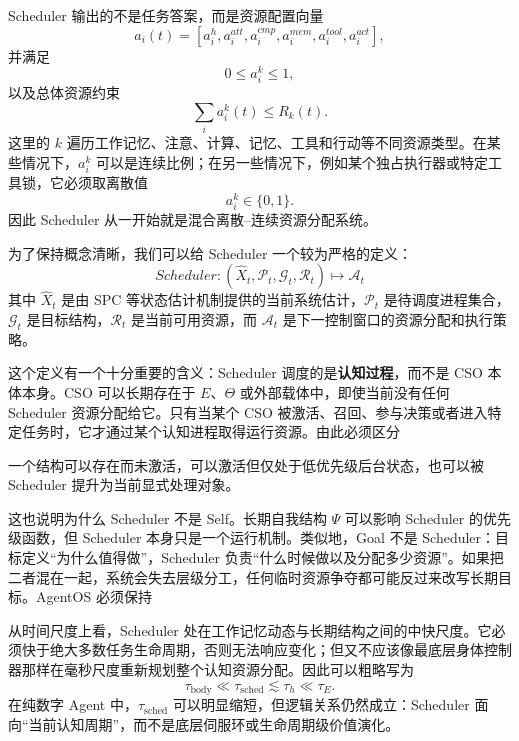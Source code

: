 Scheduler 输出的不是任务答案，而是资源配置向量
\[
a_i(t)=
\left[
a_i^h,
a_i^{att},
a_i^{cmp},
a_i^{mem},
a_i^{tool},
a_i^{act}
\right],
\]
并满足
\[
0\leq a_i^k\leq 1,
\]
以及总体资源约束
\[
\sum_i a_i^k(t)\leq R_k(t).
\]
这里的 $k$ 遍历工作记忆、注意、计算、记忆、工具和行动等不同资源类型。在某些情况下，$a_i^k$ 可以是连续比例；在另一些情况下，例如某个独占执行器或特定工具锁，它必须取离散值
\[
a_i^k\in\{0,1\}.
\]
因此 Scheduler 从一开始就是混合离散--连续资源分配系统。

为了保持概念清晰，我们可以给 Scheduler 一个较为严格的定义：
\[
\boxed{
Scheduler:
(\widehat X_t,\mathcal P_t,\mathcal G_t,\mathcal R_t)
\mapsto
\mathcal A_t
}
\]
其中 $\widehat X_t$ 是由 SPC 等状态估计机制提供的当前系统估计，$\mathcal P_t$ 是待调度进程集合，$\mathcal G_t$ 是目标结构，$\mathcal R_t$ 是当前可用资源，而 $\mathcal A_t$ 是下一控制窗口的资源分配和执行策略。

这个定义有一个十分重要的含义：Scheduler 调度的是\textbf{认知过程}，而不是 CSO 本体本身。CSO 可以长期存在于 $E$、$\Theta$ 或外部载体中，即使当前没有任何 Scheduler 资源分配给它。只有当某个 CSO 被激活、召回、参与决策或者进入特定任务时，它才通过某个认知进程取得运行资源。由此必须区分
\begin{statementbox}
\centering
{}
\end{statementbox}
一个结构可以存在而未激活，可以激活但仅处于低优先级后台状态，也可以被 Scheduler 提升为当前显式处理对象。

这也说明为什么 Scheduler 不是 Self。长期自我结构 $\Psi$ 可以影响 Scheduler 的优先级函数，但 Scheduler 本身只是一个运行机制。类似地，Goal 不是 Scheduler：目标定义“为什么值得做”，Scheduler 负责“什么时候做以及分配多少资源”。如果把二者混在一起，系统会失去层级分工，任何临时资源争夺都可能反过来改写长期目标。AgentOS 必须保持
\begin{statementbox}
\centering
{}
\end{statementbox}

从时间尺度上看，Scheduler 处在工作记忆动态与长期结构之间的中快尺度。它必须快于绝大多数任务生命周期，否则无法响应变化；但又不应该像最底层身体控制器那样在毫秒尺度重新规划整个认知资源分配。因此可以粗略写为
\[
\tau_{\mathrm{body}}
\ll
\tau_{\mathrm{sched}}
\lesssim
\tau_h
\ll
\tau_E.
\]
在纯数字 Agent 中，$\tau_{\mathrm{sched}}$ 可以明显缩短，但逻辑关系仍然成立：Scheduler 面向“当前认知周期”，而不是底层伺服环或生命周期级价值演化。

